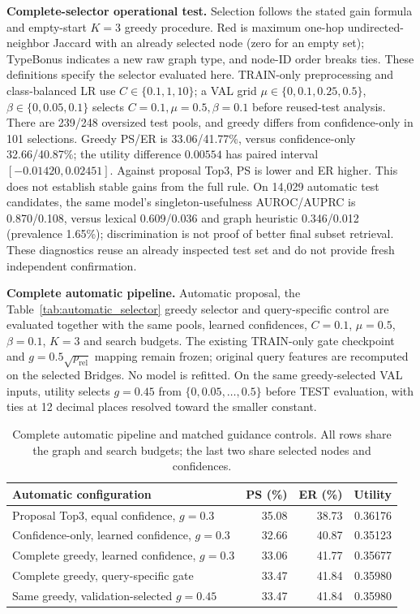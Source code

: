 \documentclass{article} %
\newcommand{\rev}[1]{{\color{blue}#1}}
\begin{document}
\noindent\textbf{Complete-selector operational test.} Selection follows the stated gain formula and empty-start $K=3$ greedy procedure. Red is maximum one-hop undirected-neighbor Jaccard with an already selected node (zero for an empty set); TypeBonus indicates a new raw graph type, and node-ID order breaks ties. These definitions specify the selector evaluated here. TRAIN-only preprocessing and class-balanced LR use $C\in\{0.1,1,10\}$; a VAL grid $\mu\in\{0,0.1,0.25,0.5\}$, $\beta\in\{0,0.05,0.1\}$ selects $C=0.1,\mu=0.5,\beta=0.1$ before reused-test analysis. \rev{There are 239/248 oversized test pools, and greedy differs from confidence-only in 101 selections. Greedy PS/ER is 33.06/41.77\%, versus confidence-only 32.66/40.87\%; the utility difference $0.00554$ has paired interval $[-0.01420,0.02451]$. Against proposal Top3, PS is lower and ER higher. This does not establish stable gains from the full rule. On 14,029 automatic test candidates, the same model's singleton-usefulness AUROC/AUPRC is 0.870/0.108, versus lexical 0.609/0.036 and graph heuristic 0.346/0.012 (prevalence 1.65\%); discrimination is not proof of better final subset retrieval.} These diagnostics reuse an already inspected test set and do not provide fresh independent confirmation.

\noindent\textbf{Complete automatic pipeline.} Automatic proposal, the Table~\ref{tab:automatic_selector} greedy selector and query-specific control are evaluated together with the same pools, learned confidences, $C=0.1$, $\mu=0.5$, $\beta=0.1$, $K=3$ and search budgets. The existing TRAIN-only gate checkpoint and $g=0.5\sqrt{p_{\mathrm{rel}}}$ mapping remain frozen; original query features are recomputed on the selected Bridges. No model is refitted. On the same greedy-selected VAL inputs, utility selects $g=0.45$ from $\{0,0.05,\ldots,0.5\}$ before TEST evaluation, with ties at 12 decimal places resolved toward the smaller constant.

\begin{table}[t]
\centering
\caption{Complete automatic pipeline and matched guidance controls. All rows share the graph and search budgets; the last two share selected nodes and confidences.}
\label{tab:automatic_pipeline}
\small
\setlength{\tabcolsep}{5pt}
\begin{tabular}{lrrr}
\toprule
Automatic configuration & PS (\%) & ER (\%) & Utility \\
\midrule
{\color{blue}Proposal Top3, equal confidence, $g=0.3$} & \rev{35.08} & \rev{38.73} & \rev{0.36176} \\
{\color{blue}Confidence-only, learned confidence, $g=0.3$} & \rev{32.66} & \rev{40.87} & \rev{0.35123} \\
{\color{blue}Complete greedy, learned confidence, $g=0.3$} & \rev{33.06} & \rev{41.77} & \rev{0.35677} \\
{\color{blue}Complete greedy, query-specific gate} & \rev{33.47} & \rev{41.84} & \rev{0.35980} \\
{\color{blue}Same greedy, validation-selected $g=0.45$} & \rev{33.47} & \rev{41.84} & \rev{0.35980} \\
\bottomrule
\end{tabular}
\end{table}
\end{document}
